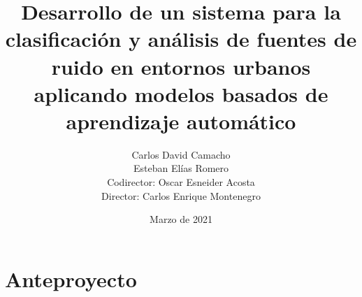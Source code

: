 \documentclass[openany,12pt]{book}
\title{Desarrollo de un sistema para la clasificación y análisis de fuentes de ruido en entornos urbanos aplicando modelos basados de aprendizaje automático}
\author{Carlos David Camacho\\Esteban Elías Romero\\Codirector: Oscar Esneider Acosta\\Director: Carlos Enrique Montenegro}
\date{Marzo de 2021}
\begin{document}
\maketitle
\tableofcontents

\part{Anteproyecto}


 



















\medskip

\printbibliography
\end{document}
